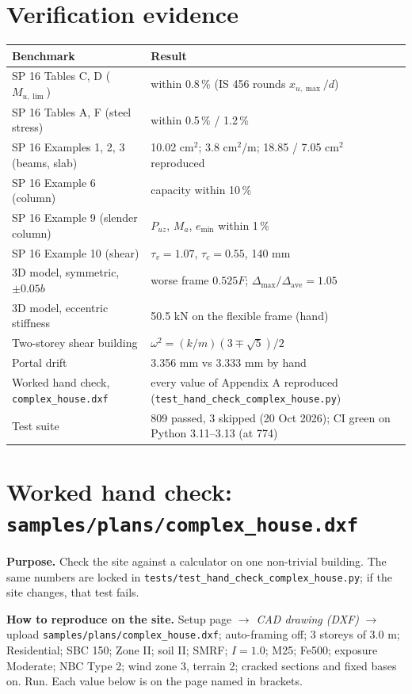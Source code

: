\documentclass[10pt,a4paper]{article}
\newcommand{\code}[1]{\texttt{\small #1}}
\begin{document}
\section{Verification evidence}
\begin{longtable}{L{68mm}L{96mm}}
\toprule \textbf{Benchmark} & \textbf{Result} \\ \midrule \endhead
SP 16 Tables C, D ($M_{u,\lim}$) & within 0.8\,\% (IS 456 rounds $x_{u,\max}/d$) \\
SP 16 Tables A, F (steel stress) & within 0.5\,\% / 1.2\,\% \\
SP 16 Examples 1, 2, 3 (beams, slab) & 10.02 cm$^2$; 3.8 cm$^2$/m; 18.85 / 7.05 cm$^2$ reproduced \\
SP 16 Example 6 (column) & capacity within 10\,\% \\
SP 16 Example 9 (slender column) & $P_{uz}$, $M_a$, $e_\text{min}$ within 1\,\% \\
SP 16 Example 10 (shear) & $\tau_v=1.07$, $\tau_c=0.55$, 140 mm \\
3D model, symmetric, $\pm0.05b$ & worse frame $0.525F$; $\Delta_\text{max}/\Delta_\text{ave}=1.05$ \\
3D model, eccentric stiffness & 50.5 kN on the flexible frame (hand) \\
Two-storey shear building & $\omega^2=(k/m)(3\mp\sqrt5)/2$ \\
Portal drift & 3.356 mm vs 3.333 mm by hand \\
Worked hand check, \code{complex\_house.dxf} & every value of Appendix A reproduced (\code{test\_hand\_check\_complex\_house.py}) \\
Test suite & 809 passed, 3 skipped (20 Oct 2026); CI green on Python 3.11--3.13 (at 774) \\
\bottomrule
\end{longtable}

\appendix
\section{Worked hand check: \texttt{samples/plans/complex\_house.dxf}}\label{app:hand}
\textbf{Purpose.} Check the site against a calculator on one non-trivial building. The same numbers are locked in
\code{tests/test\_hand\_check\_complex\_house.py}; if the site changes, that test fails.

\textbf{How to reproduce on the site.} Setup page $\rightarrow$ \emph{CAD drawing (DXF)} $\rightarrow$ upload
\code{samples/plans/complex\_house.dxf}; auto-framing off; 3 storeys of 3.0 m; Residential; SBC 150; Zone II; soil
II; SMRF; $I=1.0$; M25; Fe500; exposure Moderate; NBC Type 2; wind zone 3, terrain 2; cracked sections and fixed
bases on. Run. Each value below is on the page named in brackets.
\end{document}
